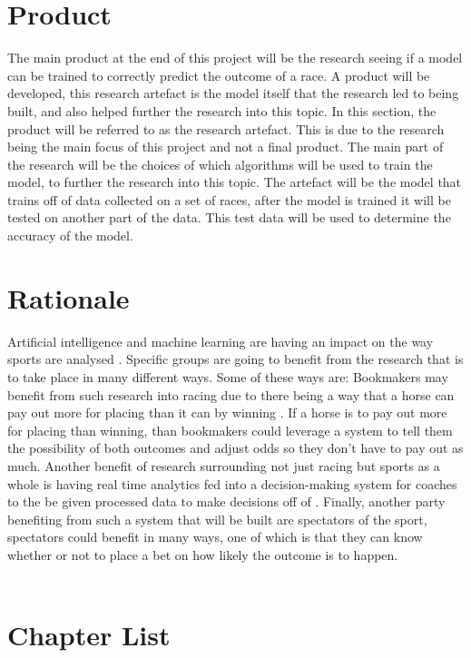 \section{Product}
The main product at the end of this project will be the research seeing if a model can be trained to correctly predict the outcome of a race. A product will be developed, this research artefact is the model itself that the research led to being built, and also helped further the research into this topic. In this section, the product will be referred to as the research artefact. This is due to the research being the main focus of this project and not a final product. The main part of the research will be the choices of which algorithms will be used to train the model, to further the research into this topic.
The artefact will be the model that trains off of data collected on a set of races, after the model is trained it will be tested on another part of the data. This test data will be used to determine the accuracy of the model.
\section{Rationale}
Artificial intelligence and machine learning are having an impact on the way sports are analysed \cite{MIN2008551} . Specific groups are going to benefit from the research that is to take place in many different ways. Some of these ways are: Bookmakers may benefit from such research into racing due to there being a way that a horse can pay out more for placing than it can by winning \cite{levitt_2014}. If a horse is to pay out more for placing than winning, than bookmakers could leverage a system to tell them the possibility of both outcomes and adjust odds so they don't have to pay out as much. Another benefit of research surrounding not just racing but sports as a whole is having real time analytics fed into a decision-making system for coaches to the be given processed data to make decisions off of \cite{7029116}. Finally, another party benefiting from such a system that will be built are spectators of the sport, spectators could benefit in many ways, one of which is that they can know whether or not to place a bet on how likely the outcome is to happen.
\\ \\

\section{Chapter List}

